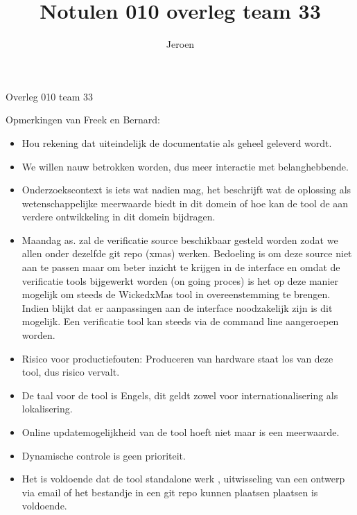 \documentclass{article}
\title{Notulen 010 overleg team 33}
\author{Jeroen}
\begin{document}

\begin{Minutes}{Overleg 010 team 33}

\maketitle%


Opmerkingen van Freek en Bernard: 
\begin{itemize}
\item Hou rekening dat uiteindelijk de documentatie als geheel geleverd wordt.
\item We willen nauw betrokken worden, dus meer interactie met belanghebbende.
\item Onderzoekscontext is iets wat nadien mag, het beschrijft wat de oplossing
als wetenschappelijke meerwaarde biedt in dit domein of hoe kan de tool de aan
verdere ontwikkeling in dit domein bijdragen.
\item Maandag as. zal de verificatie source beschikbaar gesteld worden zodat we 
allen onder dezelfde git repo (xmas) werken.
Bedoeling is om deze source niet aan te passen maar om beter inzicht te krijgen
in de interface en omdat de verificatie tools bijgewerkt worden (on going
proces) is het op deze manier mogelijk om steeds de WickedxMas tool in
overeenstemming te brengen. Indien blijkt dat er aanpassingen aan de interface
noodzakelijk zijn is dit mogelijk. Een verificatie tool kan steeds via de
command line aangeroepen worden.
\end{itemize}



\begin{itemize}
\item Risico voor productiefouten: Produceren van hardware staat los van deze tool, dus risico vervalt.
\item De taal voor de tool is Engels, dit geldt zowel voor internationalisering als lokalisering.
\item Online updatemogelijkheid van de tool hoeft niet maar is een meerwaarde.
\item Dynamische controle is geen prioriteit.
\item Het is voldoende dat de tool standalone werk , uitwisseling van een
ontwerp via email of het bestandje in een git repo kunnen plaatsen plaatsen is
voldoende.
\end{itemize}


\end{Minutes}
\end{document}
